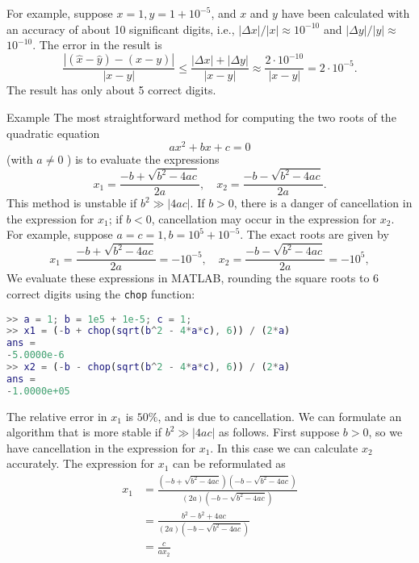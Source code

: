 For example, suppose $ x=1, y=1+10^{-5} $, and $ x $ and $ y $ have been calculated with an accuracy of about 10 significant digits, i.e., $ |\Delta x| /|x| \approx 10^{-10} $ and $ |\Delta y| /|y| \approx $ $ 10^{-10} $. The error in the result is
\begin{equation}
\frac{|(\hat{x}-\hat{y})-(x-y)|}{|x-y|} \leq \frac{|\Delta x|+|\Delta y|}{|x-y|} \approx \frac{2 \cdot 10^{-10}}{|x-y|}=2 \cdot 10^{-5} .
\end{equation}
The result has only about 5 correct digits.


\begin{example}
    Example The most straightforward method for computing the two roots of the quadratic equation
\begin{equation}
a x^{2}+b x+c=0
\end{equation}
(with $ a \neq 0 $ ) is to evaluate the expressions
\begin{equation}
x_{1}=\frac{-b+\sqrt{b^{2}-4 a c}}{2 a}, \quad x_{2}=\frac{-b-\sqrt{b^{2}-4 a c}}{2 a} .
\end{equation}
This method is unstable if $ b^{2} \gg|4 a c| $. If $ b>0 $, there is a danger of cancellation in the expression for $ x_{1} $; if $ b<0 $, cancellation may occur in the expression for $ x_{2} $.
For example, suppose $ a=c=1, b=10^{5}+10^{-5} $. The exact roots are given by
\begin{equation}
x_{1}=\frac{-b+\sqrt{b^{2}-4 a c}}{2 a}=-10^{-5}, \quad x_{2}=\frac{-b-\sqrt{b^{2}-4 a c}}{2 a}=-10^{5},
\end{equation}
We evaluate these expressions in MATLAB, rounding the square roots to 6 correct digits using the \verb|chop| function:

\begin{lstlisting}[caption=example 1 for cancellation,language=matlab]
>> a = 1; b = 1e5 + 1e-5; c = 1;
>> x1 = (-b + chop(sqrt(b^2 - 4*a*c), 6)) / (2*a)
ans =
-5.0000e-6
>> x2 = (-b - chop(sqrt(b^2 - 4*a*c), 6)) / (2*a)
ans =
-1.0000e+05
\end{lstlisting}


The relative error in $ x_{1} $ is $ 50 \% $, and is due to cancellation.
We can formulate an algorithm that is more stable if $ b^{2} \gg|4 a c| $ as follows. First suppose $ b>0 $, so we have cancellation in the expression for $ x_{1} $. In this case we can calculate $ x_{2} $ accurately. The expression for $ x_{1} $ can be reformulated as
\begin{equation}
\begin{aligned}
x_{1} &=\frac{\left(-b+\sqrt{b^{2}-4 a c}\right)\left(-b-\sqrt{b^{2}-4 a c}\right)}{(2 a)\left(-b-\sqrt{b^{2}-4 a c}\right)} \\
&=\frac{b^{2}-b^{2}+4 a c}{(2 a)\left(-b-\sqrt{b^{2}-4 a c}\right)} \\
&=\frac{c}{a x_{2}}
\end{aligned}
\end{equation}


\end{example}
